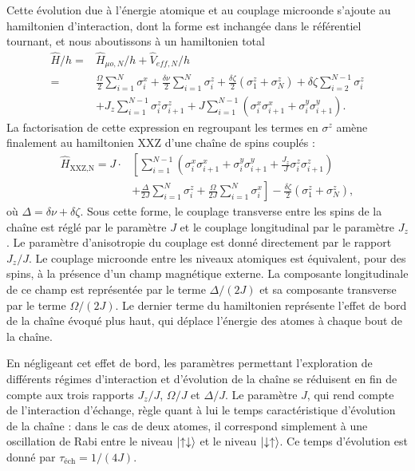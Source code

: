 Cette évolution due à l'énergie atomique et au couplage microonde s'ajoute au hamiltonien d'interaction, dont la forme est inchangée dans le référentiel tournant, et nous aboutissons à un hamiltonien total
%
\begin{equation}
\label{eq:hamilt_tot_N}
\begin{aligned}
\hat{H}/h =& %
\hat{H}_{\mu o,N}/h + \hat{V}_{eff,N}/h \\
=&
\frac{\Omega}{2}\sum_{i=1}^{N}\sigma_i^x +
\frac{\delta\nu}{2}\sum_{i=1}^{N}\sigma_i^z 
+\frac{\delta\zeta}{2} \left( \sigma_1^z + \sigma_N^z \right)
+ \delta\zeta \sum_{i=2}^{N-1} \sigma_i^z \\
&+ J_z \sum_{i=1}^{N-1} \sigma_i^z \sigma_{i+1}^z
+ J \sum_{i=1}^{N-1} \left( \sigma_i^x \sigma_{i+1}^x + \sigma_i^y \sigma_{i+1}^y \right).
\end{aligned}
\end{equation}
%
La factorisation de cette expression en regroupant les termes en $\sigma^z$ amène finalement au hamiltonien \og XXZ \fg{} d'une chaîne de spins couplés :
\begin{equation}
\label{eq:XXZ_Natoms}
\begin{aligned}
\hat{H}_{\text{XXZ,N}} =
J\cdot & \left[
\sum_{i=1}^{N-1} \left( \sigma_i^x\sigma_{i+1}^x 
+ \sigma_i^y \sigma_{i+1}^y
+ \frac{J_z}{J} \sigma_i^z\sigma_{i+1}^z \right) \right. \\
&\left. + \frac{\Delta}{2J}\sum_{i=1}^{N} \sigma_i^z
+ \frac{\Omega}{2J}\sum_{i=1}^{N} \sigma_i^x \right]
- \frac{\delta\zeta}{2}\left( \sigma_1^z + \sigma_N^z \right),
\end{aligned}
\end{equation}
où $\Delta=\delta\nu+\delta\zeta$.
Sous cette forme, le couplage transverse entre les spins de la chaîne est réglé par le paramètre $J$ et le couplage longitudinal par le paramètre $J_z$.
Le paramètre d'anisotropie du couplage est donné directement par le rapport $J_z/J$.
Le couplage microonde entre les niveaux atomiques est équivalent, pour des spins, à la présence d'un champ magnétique externe.
La composante longitudinale de ce \og champ \fg{} est représentée par le terme $\Delta/(2J)$ et sa composante transverse par le terme $\Omega/(2J)$.
Le dernier terme du hamiltonien représente l'effet de bord de la chaîne évoqué plus haut, qui déplace l'énergie des atomes à chaque bout de la chaîne.

En négligeant cet effet de bord, les paramètres permettant l'exploration de différents régimes d'interaction et d'évolution de la chaîne se réduisent en fin de compte aux trois rapports $J_z/J$, $\Omega/J$ et $\Delta/J$.
Le paramètre $J$, qui rend compte de l'interaction d'échange, règle quant à lui le temps caractéristique d'évolution de la chaîne : dans le cas de deux atomes, il correspond simplement à une oscillation de Rabi entre le niveau $\ket{\uparrow\downarrow}$ et le niveau $\ket{\downarrow\uparrow}$.
Ce temps d'évolution est donné par $\tau_{\text{\'ech}} = 1/(4J)$.

